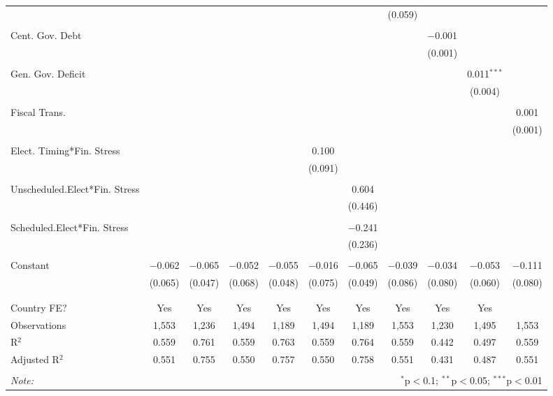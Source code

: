 \begin{table}[!htbp]
\begin{tabular}{@{\extracolsep{5pt}}lcccccccccc}
  &  &  &  &  &  &  & (0.059) &  &  &  \\ 
  & & & & & & & & & & \\ 
 Cent. Gov. Debt &  &  &  &  &  &  &  & $-$0.001 &  &  \\ 
  &  &  &  &  &  &  &  & (0.001) &  &  \\ 
  & & & & & & & & & & \\ 
 Gen. Gov. Deficit &  &  &  &  &  &  &  &  & 0.011$^{***}$ &  \\ 
  &  &  &  &  &  &  &  &  & (0.004) &  \\ 
  & & & & & & & & & & \\ 
 Fiscal Trans. &  &  &  &  &  &  &  &  &  & 0.001 \\ 
  &  &  &  &  &  &  &  &  &  & (0.001) \\ 
  & & & & & & & & & & \\ 
 Elect. Timing*Fin. Stress &  &  &  &  & 0.100 &  &  &  &  &  \\ 
  &  &  &  &  & (0.091) &  &  &  &  &  \\ 
  & & & & & & & & & & \\ 
 Unscheduled.Elect*Fin. Stress &  &  &  &  &  & 0.604 &  &  &  &  \\ 
  &  &  &  &  &  & (0.446) &  &  &  &  \\ 
  & & & & & & & & & & \\ 
 Scheduled.Elect*Fin. Stress &  &  &  &  &  & $-$0.241 &  &  &  &  \\ 
  &  &  &  &  &  & (0.236) &  &  &  &  \\ 
  & & & & & & & & & & \\ 
 Constant & $-$0.062 & $-$0.065 & $-$0.052 & $-$0.055 & $-$0.016 & $-$0.065 & $-$0.039 & $-$0.034 & $-$0.053 & $-$0.111 \\ 
  & (0.065) & (0.047) & (0.068) & (0.048) & (0.075) & (0.049) & (0.086) & (0.080) & (0.060) & (0.080) \\ 
  & & & & & & & & & & \\ 
\hline \\[-1.8ex] 
Country FE? & Yes & Yes & Yes & Yes & Yes & Yes & Yes & Yes & Yes &  \\ 
Observations & 1,553 & 1,236 & 1,494 & 1,189 & 1,494 & 1,189 & 1,553 & 1,230 & 1,495 & 1,553 \\ 
R$^{2}$ & 0.559 & 0.761 & 0.559 & 0.763 & 0.559 & 0.764 & 0.559 & 0.442 & 0.497 & 0.559 \\ 
Adjusted R$^{2}$ & 0.551 & 0.755 & 0.550 & 0.757 & 0.550 & 0.758 & 0.551 & 0.431 & 0.487 & 0.551 \\ 
\hline 
\hline \\[-1.8ex] 
\textit{Note:}  & \multicolumn{10}{r}{$^{*}$p$<$0.1; $^{**}$p$<$0.05; $^{***}$p$<$0.01} \\ 
\end{tabular} 
\end{table} 
